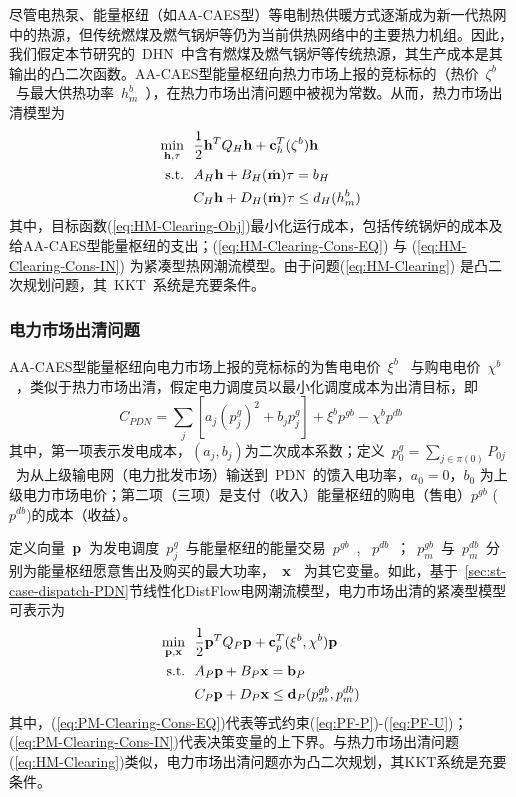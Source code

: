尽管电热泵、能量枢纽（如AA-CAES型）等电制热供暖方式逐渐成为新一代热网中的热源\cite{4th-DHN-14}，但传统燃煤及燃气锅炉等仍为当前供热网络中的主要热力机组。因此，我们假定本节研究的~DHN~中含有燃煤及燃气锅炉等传统热源，其生产成本是其输出的凸二次函数。AA-CAES型能量枢纽向热力市场上报的竞标标的（热价~$\zeta^b$~与最大供热功率~$h_m^b$~），在热力市场出清问题中被视为常数。从而，热力市场出清模型为
\begin{subequations}
\label{eq:HM-Clearing}
\begin{align}
\min_{{\bf h}, \tau}~~ & \frac{1}{2} {\bf h}^T Q_H {\bf h} + {\bf c}^T_h (\zeta^b) {\bf h}
\label{eq:HM-Clearing-Obj}  \\
\mbox{s.t.} ~~ &A_H{\bf h} + B_H(\dot {\bf m})\tau = b_H \label{eq:HM-Clearing-Cons-EQ}\\
       & C_H{\bf h} + D_H(\dot {\bf m})\tau \le d_H(h^b_m)
\label{eq:HM-Clearing-Cons-IN}
\end{align}
\end{subequations}
其中，目标函数(\ref{eq:HM-Clearing-Obj})最小化运行成本，包括传统锅炉的成本及给AA-CAES型能量枢纽的支出；(\ref{eq:HM-Clearing-Cons-EQ}) 与 (\ref{eq:HM-Clearing-Cons-IN}) 为紧凑型热网潮流模型。由于问题(\ref{eq:HM-Clearing}) 是凸二次规划问题，其~KKT~系统是充要条件。

\subsubsection{电力市场出清问题}
AA-CAES型能量枢纽向电力市场上报的竞标标的为售电电价~$\xi^b$~ 与购电电价~$\chi^b$~，类似于热力市场出清，假定电力调度员以最小化调度成本为出清目标，即
\begin{equation}
C_{PDN} =  \sum_j \left[ a_j (p_j^g)^2 + b_j p_j^g \right]
+ \xi^b p^{gb}  - \chi^b p^{db}
\end{equation}
其中，第一项表示发电成本，$(a_j,b_j)$为二次成本系数；定义~$p^g_0 = \sum_{j \in \pi(0)} P_{0j}$~为从上级输电网（电力批发市场）输送到~PDN~的馈入电功率，$a_0=0$，$b_0$ 为上级电力市场电价；第二项（三项）是支付（收入）能量枢纽的购电（售电）$p^{gb}$ ($p^{db}$)的成本（收益）。

定义向量~$\bf p$~为发电调度~$p^g_j$~与能量枢纽的能量交易~$p^{gb}$~, ~$p^{db}$~；~$p_m^{gb}$~与~$p_m^{db}$~分别为能量枢纽愿意售出及购买的最大功率，~$\bf x$~ 为其它变量。如此，基于~\ref{sec:st-case-dispatch-PDN}节线性化DistFlow电网潮流模型，电力市场出清的紧凑型模型可表示为
\begin{subequations}
\label{eq:PM-Clearing}
\begin{align}
\min_{\bf p,x}~~ & \frac{1}{2} {\bf p}^T Q_P {\bf p} + {\bf c}^T_p (\xi^b,\chi^b) {\bf p}   \label{eq:PM-Clearing-Obj}  \\
\mbox{s.t.} ~~ &  A_P {\bf p} + B_P {\bf x} = {\bf b}_P
\label{eq:PM-Clearing-Cons-EQ}  \\
       & C_P {\bf p} + D_P {\bf x} \le {\bf d}_P(p^{gb}_m, p^{db}_m)
\label{eq:PM-Clearing-Cons-IN}
\end{align}
\end{subequations}
其中，(\ref{eq:PM-Clearing-Cons-EQ})代表等式约束(\ref{eq:PF-P})-(\ref{eq:PF-U})；(\ref{eq:PM-Clearing-Cons-IN})代表决策变量的上下界。与热力市场出清问题(\ref{eq:HM-Clearing})类似，电力市场出清问题亦为凸二次规划，其KKT系统是充要条件。


